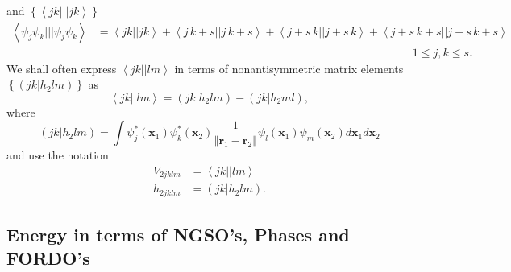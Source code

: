 \documentclass[titlepage]{article}%
\begin{document}
and $\left\{  \left\langle jk|||jk\right\rangle \right\}  $
\begin{align}
\left\langle \psi_{j}\psi_{k}|||\psi_{j}\psi_{k}\right\rangle  &
=\left\langle jk||jk\right\rangle +\left\langle j\,k+s||j\,k+s\right\rangle
+\left\langle j+s\,k||j+s\,k\right\rangle +\left\langle
j+s\,k+s||j+s\,k+s\right\rangle \nonumber\\
&  \left.  {}\right.  \qquad\qquad\qquad\qquad\qquad\qquad\qquad\qquad
\qquad\qquad\qquad\qquad\qquad\qquad1\leq j,k\leq s.
\end{align}
We shall often express $\left\langle jk||lm\right\rangle $ in terms of
nonantisymmetric matrix elements $\left\{  \left(  \left.  jk\right\vert
h_{2}lm\right)  \right\}  $ as
\begin{equation}
\left\langle jk||lm\right\rangle =\left(  \left.  jk\right\vert h_{2}%
lm\right)  -\left(  \left.  jk\right\vert h_{2}ml\right)  ,
\end{equation}
where
\begin{equation}
\left(  \left.  jk\right\vert h_{2}lm\right)  =\int\psi_{j}^{\ast}\left(
\bm{x}_{1}\right)  \psi_{k}^{\ast}\left(  \bm{x}_{2}\right)  \frac
{1}{\left\Vert \bm{r}_{1}-\bm{r}_{2}\right\Vert }\psi_{l}\left(
\bm{x}_{1}\right)  \psi_{m}\left(  \bm{x}_{2}\right)  d\bm{x}_{1}d\bm{x}_{2}%
\end{equation}
and use the notation
\begin{align}
V_{2jklm}  &  =\left\langle jk||lm\right\rangle \nonumber\\
h_{2jklm}  &  =\left(  \left.  jk\right\vert h_{2}lm\right)  .
\end{align}


\subsection{Energy in terms of NGSO's, Phases and FORDO's\label{EnON_NGSO}}
\end{document}
